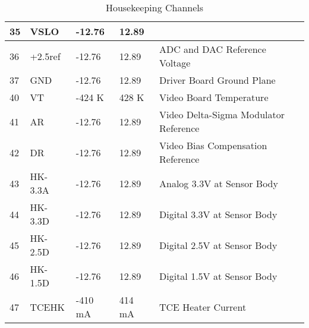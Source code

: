 \begin{table}[h]
\begin{tabular}{|l|l|l|l|l|}
35 & VSLO & -12.76 & 12.89&\\
\hline
36 & +2.5ref & -12.76 & 12.89& ADC and DAC Reference Voltage\\
\hline
37 & GND & -12.76 & 12.89& Driver Board Ground Plane\\
\hline
40 & VT & -424 K& 428 K & Video Board Temperature\\
\hline
41 & AR & -12.76 & 12.89& Video Delta-Sigma Modulator Reference\\
\hline
42 & DR &-12.76 & 12.89& Video Bias Compensation Reference\\
\hline
43 & HK-3.3A &-12.76 & 12.89& Analog 3.3V at Sensor Body\\
\hline
44 & HK-3.3D &-12.76 & 12.89& Digital 3.3V at Sensor Body\\
\hline
45 & HK-2.5D &-12.76 & 12.89& Digital 2.5V at Sensor Body\\
\hline
46 & HK-1.5D &-12.76 & 12.89& Digital 1.5V at Sensor Body\\
\hline
47 & TCEHK & -410 mA& 414 mA & TCE Heater Current\\
\hline
\end{tabular}
\caption{Housekeeping Channels}
\label{HKC}
\end{table}


